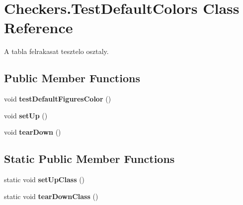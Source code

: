 \hypertarget{class_checkers_1_1_test_default_colors}{}\section{Checkers.\+Test\+Default\+Colors Class Reference}
\label{class_checkers_1_1_test_default_colors}


A tabla felrakasat tesztelo osztaly.  


\subsection*{Public Member Functions}
\begin{DoxyCompactItemize}
\item 
\hypertarget{class_checkers_1_1_test_default_colors_aba9afc49712767a0d56b54725f153b2f}{}void {\bfseries test\+Default\+Figures\+Color} ()\label{class_checkers_1_1_test_default_colors_aba9afc49712767a0d56b54725f153b2f}

\item 
\hypertarget{class_checkers_1_1_test_default_colors_aee9bbc2b737677e0dd4d6918c3b2d7fd}{}void {\bfseries set\+Up} ()\label{class_checkers_1_1_test_default_colors_aee9bbc2b737677e0dd4d6918c3b2d7fd}

\item 
\hypertarget{class_checkers_1_1_test_default_colors_a0f6c27514da3c622a9402780a08878a8}{}void {\bfseries tear\+Down} ()\label{class_checkers_1_1_test_default_colors_a0f6c27514da3c622a9402780a08878a8}

\end{DoxyCompactItemize}
\subsection*{Static Public Member Functions}
\begin{DoxyCompactItemize}
\item 
\hypertarget{class_checkers_1_1_test_default_colors_a4d4cf5789a98c263883675826a54d3a3}{}static void {\bfseries set\+Up\+Class} ()\label{class_checkers_1_1_test_default_colors_a4d4cf5789a98c263883675826a54d3a3}

\item 
\hypertarget{class_checkers_1_1_test_default_colors_aae8651d3f1c679af8209d7349bb0b7ff}{}static void {\bfseries tear\+Down\+Class} ()\label{class_checkers_1_1_test_default_colors_aae8651d3f1c679af8209d7349bb0b7ff}

\end{DoxyCompactItemize}


